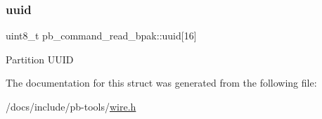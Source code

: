 \subsubsection{\texorpdfstring{uuid}{uuid}}
{\footnotesize\ttfamily uint8\+\_\+t pb\+\_\+command\+\_\+read\+\_\+bpak\+::uuid\mbox{[}16\mbox{]}}

Partition U\+U\+ID 

The documentation for this struct was generated from the following file\+:\begin{DoxyCompactItemize}
\item 
/docs/include/pb-\/tools/\hyperlink{wire_8h}{wire.\+h}\end{DoxyCompactItemize}
